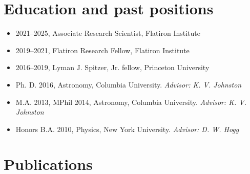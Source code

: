 \documentclass[12pt, letterpaper]{apw-cv}
\begin{document}
\section*{Education and past positions}
	\begin{itemize}
        \item 2021--2025, Associate Research Scientist, Flatiron Institute
        \item 2019--2021, Flatiron Research Fellow, Flatiron Institute
        \item 2016--2019, Lyman J. Spitzer, Jr. fellow, Princeton University
	\item Ph. D. 2016, Astronomy, Columbia University.
		{\it Advisor: K. V. Johnston}
	\item M.A. 2013, MPhil 2014, Astronomy, Columbia University.
		{\it Advisor: K. V. Johnston}
	\item Honors B.A. 2010, Physics, New York University.
		{\it Advisor: D. W. Hogg}
	\end{itemize}



\section*{Publications}
\vspace{-1em}
\end{document}
